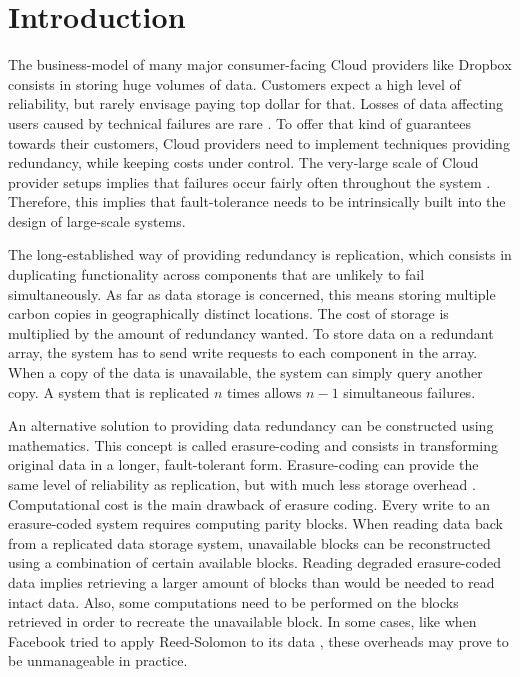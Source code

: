 \section{Introduction}

The business-model of many major consumer-facing Cloud providers like Dropbox consists in storing huge volumes of data.
Customers expect a high level of reliability, but rarely envisage paying top dollar for that.
Losses of data affecting users caused by technical failures are rare \autocite{racs}.
To offer that kind of guarantees towards their customers, Cloud providers need to implement techniques providing redundancy, while keeping costs under control.
The very-large scale of Cloud provider setups implies that failures occur fairly often throughout the system \autocite{failures-study}.
Therefore, this implies that fault-tolerance needs to be intrinsically built into the design of large-scale systems.

The long-established way of providing redundancy is replication, which consists in duplicating functionality across components that are unlikely to fail simultaneously.
As far as data storage is concerned, this means storing multiple carbon copies in geographically distinct locations.
The cost of storage is multiplied by the amount of redundancy wanted.
To store data on a redundant array, the system has to send write requests to each component in the array.
When a copy of the data is unavailable, the system can simply query another copy.
A system that is replicated $n$ times allows $n-1$ simultaneous failures.

An alternative solution to providing data redundancy can be constructed using mathematics.
This concept is called erasure-coding and consists in transforming original data in a longer, fault-tolerant form.
Erasure-coding can provide the same level of reliability as replication, but with much less storage overhead \autocite{Weatherspoon2002}.
Computational cost is the main drawback of erasure coding.
Every write to an erasure-coded system requires computing parity blocks.
When reading data back from a replicated data storage system, unavailable blocks can be reconstructed using a combination of certain available blocks.
Reading degraded erasure-coded data implies retrieving a larger amount of blocks than would be needed to read intact data.
Also, some computations need to be performed on the blocks retrieved in order to recreate the unavailable block.
In some cases, like when Facebook tried to apply Reed-Solomon to its data \autocite{XorbasVLDB}, these overheads may prove to be unmanageable in practice.

